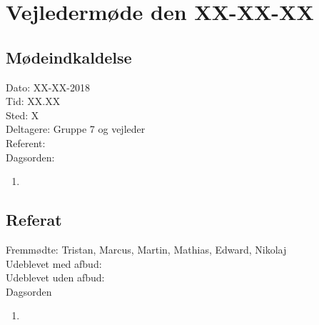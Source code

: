 \section{Vejledermøde den XX-XX-XX}
\subsection{Mødeindkaldelse}
Dato: XX-XX-2018
\\Tid: XX.XX
\\Sted: X
\\Deltagere: Gruppe 7 og vejleder
\\Referent: 
\\Dagsorden:
\begin{enumerate}
    \item 
\end{enumerate}

\subsection{Referat}
 Fremmødte: Tristan, Marcus, Martin, Mathias, Edward, Nikolaj 
 \\Udeblevet med afbud:
 \\Udeblevet uden afbud: 
 \\Dagsorden 
 
 \begin{enumerate}
    \item 
\end{enumerate}
